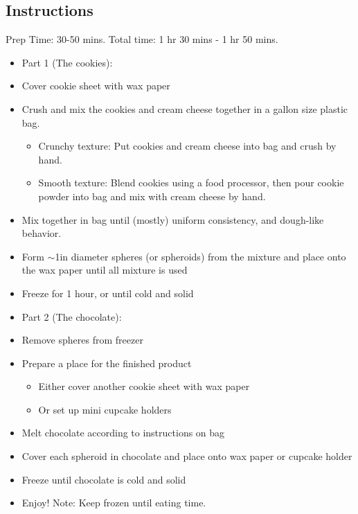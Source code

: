 \documentclass{article}
\begin{document}
\subsection{Instructions}
Prep Time: 30-50 mins. Total time: 1 hr 30 mins - 1 hr 50 mins.
\begin{itemize}
\item Part 1 (The cookies):
\item Cover cookie sheet with wax paper
\item Crush and mix the cookies and cream cheese together in a gallon size plastic bag.
\begin{itemize}
\item Crunchy texture: Put cookies and cream cheese into bag and crush by hand.
\item Smooth texture: Blend cookies using a food processor, then pour cookie powder into bag and mix with cream cheese by hand.
\end{itemize}
\item Mix together in bag until (mostly) uniform consistency, and dough-like behavior.
\item Form $\sim$1in diameter spheres (or spheroids) from the mixture and place onto the wax paper until all mixture is used
\item Freeze for 1 hour, or until cold and solid
\item Part 2 (The chocolate):
\item Remove spheres from freezer
\item Prepare a place for the finished product
\begin{itemize}
\item Either cover another cookie sheet with wax paper
\item Or set up mini cupcake holders
\end{itemize}
\item Melt chocolate according to instructions on bag
\item Cover each spheroid in chocolate and place onto wax paper or cupcake holder
\item Freeze until chocolate is cold and solid
\item Enjoy! Note: Keep frozen until eating time.
\end{itemize}
\end{document}
